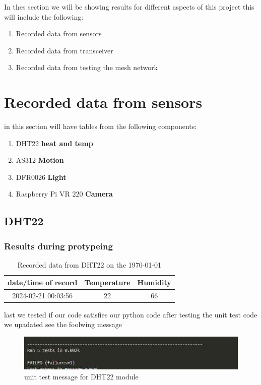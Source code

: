 In thes section we will  be showing results for  different aspects of this project this  will  include the following:
\begin{enumerate}
    \item Recorded data from sensors
    \item Recorded data from transceiver
    \item Recorded data from  testing the mesh network
\end{enumerate}
\section{Recorded data from sensors}
in this section  will have  tables from the following components:
\begin{enumerate}
    \item DHT22 \textbf{heat and temp}
    \item AS312 \textbf{Motion }
    \item DFR0026 \textbf{Light}
    \item Raspberry Pi VR 220 \textbf{Camera}
\end{enumerate}
\subsection{DHT22}
\subsubsection{Results during protypeing}
\begin{table}[h!]
    \centering

    \begin{tabular}{|c|c|c|}
        \hline
        date/time of record & Temperature &Humidity \\
        \hline\hline
        2024-02-21 00:03:56&22& 66 \\
        \hline
    \end{tabular}
    \caption{Recorded data from  DHT22 on the \today}
    \label{Recorded data from  DHT22 on the \today}
\end{table}

last we tested if our code  satisfies our  python code after testing the unit test code we upadated see the foolwing message
\begin{figure}[h!]
    \centering
    \includegraphics[width=0.5\linewidth]{Images/unit_testoutput.jpg}
    \caption{unit test message for DHT22 module}
    \label{unit test message for DHT22 module}
\end{figure}
\newpage
